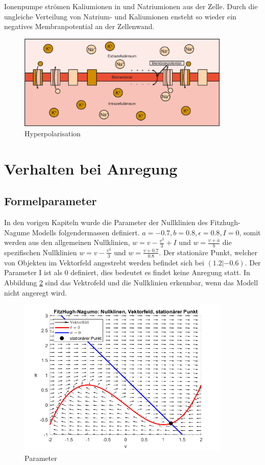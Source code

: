\begin{refsection}
Ionenpumpe strömen Kaliumionen in und Natriumionen aus der Zelle.
Durch die ungleiche Verteilung von Natrium- und Kaliumionen ensteht so wieder ein negatives Membranpotential an der Zellenwand.
\begin{figure}[H]
    \centering
    \includegraphics[width=0.9\textwidth]{papers/nerven/Bilder/Vorgang5.png}
    \caption{Hyperpolarisation}
    \label{fig:Hyperpolarisation}
\end{figure}

\section{Verhalten bei Anregung}
\subsection{Formelparameter}
In den vorigen Kapiteln wurde die Parameter der Nullklinien des Fitzhugh-Nagume Modells folgendermassen definiert.
\(a = -0.7, b = 0.8, \epsilon = 0.8, I = 0\), somit werden aus den allgemeinen Nullklinien, \( w = v - \frac{v^3}{3} + I\)
und \(w = \frac{v + a}{b}\) die spezifischen Nullklinien \( w = v - \frac{v^3}{3}\)
und \(w = \frac{v + 0.7}{0.8}\).
Der stationäre Punkt, welcher von Objekten im Vektorfeld angestrebt werden befindet sich bei \((1.2 |-0.6)\).
Der Parameter I ist als 0 definiert, dies bedeutet es findet keine Anregung statt.
In Abbildung \ref{fig:Parameter} sind das Vektrofeld und die Nullklinien erkennbar, wenn das Modell nicht angeregt wird.
\begin{figure}[H]
    \centering
    \includegraphics[width=0.9\textwidth]{papers/nerven/Bilder/Anregung1.png}
    \caption{Parameter}
    \label{fig:Parameter}
\end{figure}

\end{refsection}
